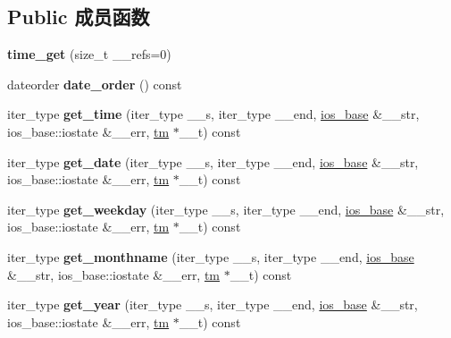 \subsection*{Public 成员函数}
\begin{DoxyCompactItemize}
\item 
\mbox{\label{classtime__get_ae71398972541f64c638ed5b7400586de}} 
{\bfseries time\+\_\+get} (size\+\_\+t \+\_\+\+\_\+refs=0)
\item 
\mbox{\label{classtime__get_afd12ffe235539b33192c5d349429d359}} 
dateorder {\bfseries date\+\_\+order} () const
\item 
\mbox{\label{classtime__get_af3ece57011c75e95b7972888d234aca9}} 
iter\+\_\+type {\bfseries get\+\_\+time} (iter\+\_\+type \+\_\+\+\_\+s, iter\+\_\+type \+\_\+\+\_\+end, \hyperlink{classios__base}{ios\+\_\+base} \&\+\_\+\+\_\+str, ios\+\_\+base\+::iostate \&\+\_\+\+\_\+err, \hyperlink{structtm}{tm} $\ast$\+\_\+\+\_\+t) const
\item 
\mbox{\label{classtime__get_aaebb1d264be447bc9730b193ce7e9bc3}} 
iter\+\_\+type {\bfseries get\+\_\+date} (iter\+\_\+type \+\_\+\+\_\+s, iter\+\_\+type \+\_\+\+\_\+end, \hyperlink{classios__base}{ios\+\_\+base} \&\+\_\+\+\_\+str, ios\+\_\+base\+::iostate \&\+\_\+\+\_\+err, \hyperlink{structtm}{tm} $\ast$\+\_\+\+\_\+t) const
\item 
\mbox{\label{classtime__get_a76c5061c4fa1f7d8ec59e48bb9f71879}} 
iter\+\_\+type {\bfseries get\+\_\+weekday} (iter\+\_\+type \+\_\+\+\_\+s, iter\+\_\+type \+\_\+\+\_\+end, \hyperlink{classios__base}{ios\+\_\+base} \&\+\_\+\+\_\+str, ios\+\_\+base\+::iostate \&\+\_\+\+\_\+err, \hyperlink{structtm}{tm} $\ast$\+\_\+\+\_\+t) const
\item 
\mbox{\label{classtime__get_a710fed23da559796d7c34274d191486a}} 
iter\+\_\+type {\bfseries get\+\_\+monthname} (iter\+\_\+type \+\_\+\+\_\+s, iter\+\_\+type \+\_\+\+\_\+end, \hyperlink{classios__base}{ios\+\_\+base} \&\+\_\+\+\_\+str, ios\+\_\+base\+::iostate \&\+\_\+\+\_\+err, \hyperlink{structtm}{tm} $\ast$\+\_\+\+\_\+t) const
\item 
\mbox{\label{classtime__get_ac74185abf2a9670bbe1e8d28107ad5b9}} 
iter\+\_\+type {\bfseries get\+\_\+year} (iter\+\_\+type \+\_\+\+\_\+s, iter\+\_\+type \+\_\+\+\_\+end, \hyperlink{classios__base}{ios\+\_\+base} \&\+\_\+\+\_\+str, ios\+\_\+base\+::iostate \&\+\_\+\+\_\+err, \hyperlink{structtm}{tm} $\ast$\+\_\+\+\_\+t) const
\end{DoxyCompactItemize}
